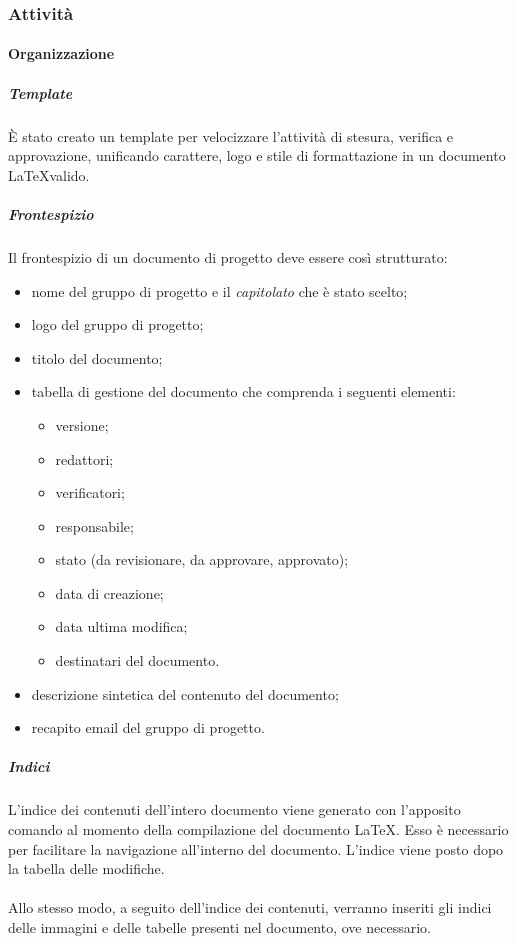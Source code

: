   \subsubsection{Attività}
  \paragraph{Organizzazione}
  \subparagraph*{Template}
  \`E stato creato un template per velocizzare l'attività di stesura, verifica e
  approvazione, unificando carattere, logo e stile di formattazione
  in un documento \LaTeX \space valido.

  \subparagraph*{Frontespizio}
  Il frontespizio di un documento di progetto deve essere così strutturato:
  \begin{itemize}
    \item nome del gruppo di progetto e il \textit{capitolato\glo} che è stato scelto;
    \item logo del gruppo di progetto;
    \item titolo del documento;
    \item tabella di gestione del documento che comprenda i seguenti elementi:
    \begin{itemize}
      \item versione;
      \item redattori;
      \item verificatori;
      \item responsabile;
      \item stato (da revisionare, da approvare, approvato);
      \item data di creazione;
      \item data ultima modifica;
      \item destinatari del documento.
    \end{itemize}
    \item descrizione sintetica del contenuto del documento;
    \item recapito email del gruppo di progetto.
  \end{itemize}
  
  \subparagraph*{Indici}
  L'indice dei contenuti dell'intero documento viene generato con l'apposito comando al momento della compilazione
  del documento \LaTeX. Esso è necessario per facilitare la navigazione all'interno del
  documento. L'indice viene posto dopo la tabella delle modifiche.\\\\
  Allo stesso modo, a seguito dell'indice dei contenuti, verranno inseriti gli indici delle immagini e delle tabelle presenti nel documento, ove necessario.

